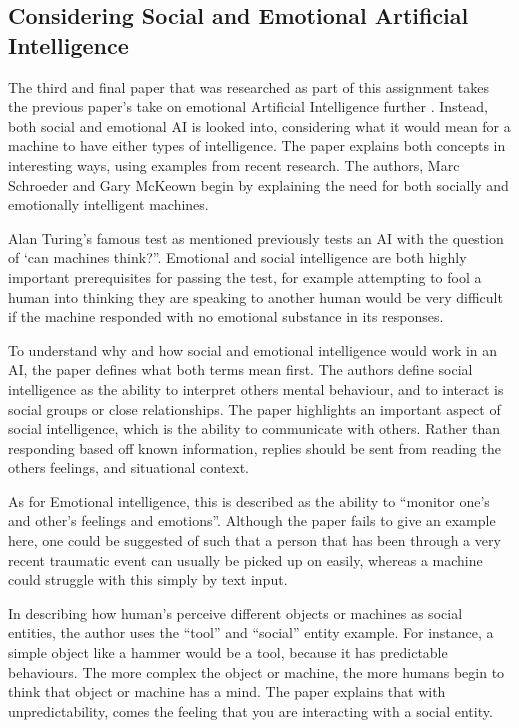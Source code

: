 \documentclass[article]{IEEEtran}
\begin{document}
\subsection{Considering Social and Emotional Artificial Intelligence}
The third and final paper that was researched as part of this assignment takes the previous paper’s take on emotional Artificial Intelligence further \cite{ethicsSocial}. Instead, both social and emotional AI is looked into, considering what it would mean for a machine to have either types of intelligence. The paper explains both concepts in interesting ways, using examples from recent research. The authors, Marc Schroeder and Gary McKeown begin by explaining the need for both socially and emotionally intelligent machines. \par
Alan Turing’s famous test as mentioned previously tests an AI with the question of ‘can machines think?”. Emotional and social intelligence are both highly important prerequisites for passing the test, for example attempting to fool a human into thinking they are speaking to another human would be very difficult if the machine responded with no emotional substance in its responses.	\par
To understand why and how social and emotional intelligence would work in an AI, the paper defines what both terms mean first. The authors define social intelligence as the ability to interpret others mental behaviour, and to interact is social groups or close relationships. The paper highlights an important aspect of social intelligence, which is the ability to communicate with others. Rather than responding based off known information, replies should be sent from reading the others feelings, and situational context.\par
As for Emotional intelligence, this is described as the ability to “monitor one’s and other’s feelings and emotions”. Although the paper fails to give an example here, one could be suggested of such that a person that has been through a very recent traumatic event can usually be picked up on easily, whereas a machine could struggle with this simply by text input. \par
In describing how human’s perceive different objects or machines as social entities, the author uses the “tool” and “social” entity example. For instance, a simple object like a hammer would be a tool, because it has predictable behaviours. The more complex the object or machine, the more humans begin to think that object or machine has a mind. The paper explains that with unpredictability, comes the feeling that you are interacting with a social entity.\par
\end{document}
